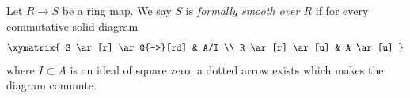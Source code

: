 \begin{definition}
\label{definition-formally-smooth}
Let $R \to S$ be a ring map.
We say $S$ is {\it formally smooth over $R$} if for every
commutative solid diagram
$$
\xymatrix{
S \ar[r] \ar@{-->}[rd] & A/I \\
R \ar[r] \ar[u] & A \ar[u]
}
$$
where $I \subset A$ is an ideal of square zero, a dotted
arrow exists which makes the diagram commute.
\end{definition}